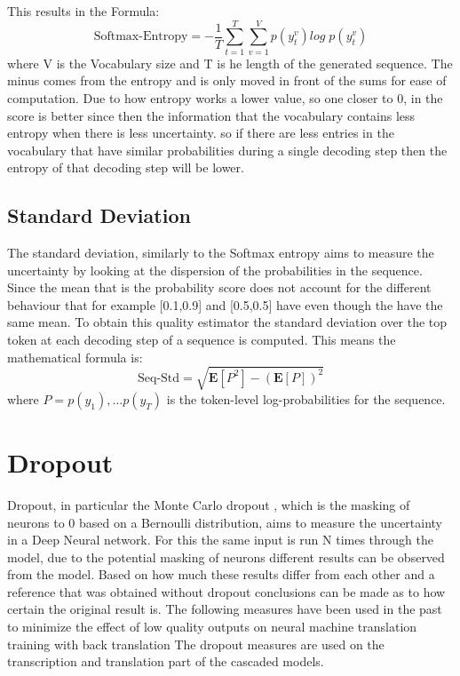 This results in the Formula:
$$\text{Softmax-Entropy}=-\frac{1}{T}\sum_{t=1}^T\sum_{v=1}^V p(y_t^v)log\; p(y_t^v) \label{formula:translation entropy}$$ where V is the Vocabulary size and T is he length of the generated sequence. The minus comes from the entropy and is only moved in front of the sums for ease of computation.
Due to how entropy works a lower value, so one closer to 0, in the score is better since then the information that the vocabulary contains less entropy when there is less uncertainty. so if there are less entries in the vocabulary that have similar probabilities during a single decoding step then the entropy of that decoding step will be lower.

\subsection{Standard Deviation}\label{sect:stddiv}
The standard deviation, similarly to the Softmax entropy aims to measure the uncertainty by looking at the dispersion of the probabilities in the sequence. 
Since the mean that is the probability score does not account for the different behaviour that for example [0.1,0.9] and [0.5,0.5] have even though the have the same mean. 
To obtain this quality estimator the standard deviation over the top token at each decoding step of a sequence is computed.
This means the mathematical formula is: $$\text{Seq-Std}=\sqrt{\mathbf{E}[P^2]-(\mathbf{E}[P])^2}$$ where $P=p(y_1) , \dots p(y_T)$ is the token-level log-probabilities for the sequence.

\section{Dropout}
Dropout, in particular the Monte Carlo dropout \cite{gal2016dropoutbayesianapproximationrepresenting}, which is the masking of neurons to 0 based on a Bernoulli distribution, aims to measure the uncertainty in a Deep Neural network. 
For this the same input is run N times through the model, due to the potential masking of neurons different results can be observed from the model. Based on how much these results differ from each other and a reference that was obtained without dropout conclusions can be made as to how certain the original result is. 
The following measures have been used in the past to minimize the effect of low quality outputs on neural machine translation training with back translation \cite{wang-etal-2018-alibaba}
The dropout measures are used on the transcription and translation part of the cascaded models. 


